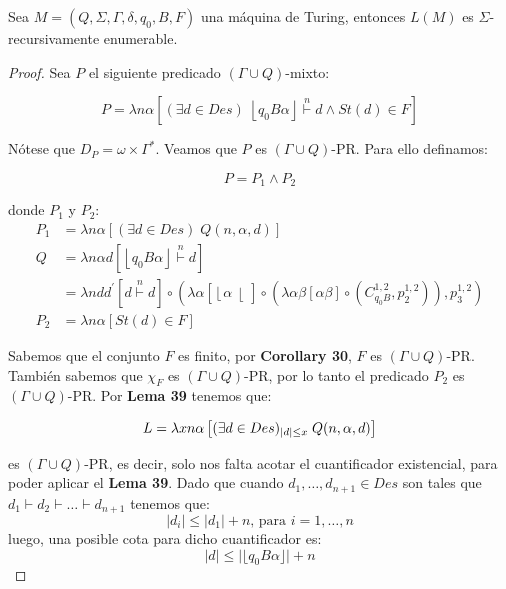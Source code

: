   \begin{theorem}
  	\PN Sea $M = \left(Q, \Sigma, \Gamma, \delta, q_{0}, B, F\right)$ una máquina de Turing, entonces $L(M)$ es
    $\Sigma$-recursivamente enumerable.
  \end{theorem}
  \begin{proof}
    \PN Sea $P$ el siguiente predicado $(\Gamma \cup Q)$-mixto:

    \[
      P = \lambda n\alpha \left[(\exists d \in Des) \; \left\lfloor q_{0} B \alpha \right\rfloor \overset{n}{\vdash} d
      \wedge St(d) \in F\right]
    \]

    \PN Nótese que $D_{P} = \omega \times \Gamma^{\ast}$. Veamos que $P$ es $(\Gamma \cup Q)$-PR. Para ello definamos:

    \[
      P = P_1 \land P_2
    \]

    \PN donde $P_1$ y $P_2$:
    \begin{align*}
      P_1 &= \lambda n\alpha \left[(\exists d \in Des)\; Q(n,\alpha,d)\right] \\
        Q &= \lambda n\alpha d \left[ \left\lfloor q_{0} B \alpha \right\rfloor \overset{n}{\vdash} d\right] \\
          &= \lambda ndd^{\prime} \left[d \overset{n}{\vdash} d\right] \circ (\lambda \alpha \left[\left\lfloor \alpha
             \right\lfloor\right] \circ(\lambda \alpha\beta \left[\alpha\beta\right] \circ (C_{q_0 B}^{1,2}, p_{2}^{1,2}
             )), p_{3}^{1,2}) \\[10pt]
      P_2 &= \lambda n\alpha \left[St(d) \in F\right]
    \end{align*}

    \PN Sabemos que el conjunto $F$ es finito, por \textbf{Corollary 30}, $F$ es $(\Gamma \cup Q)$-PR. También sabemos
    que $\chi_F$ es $(\Gamma \cup Q)$-PR, por lo tanto el predicado $P_2$ es $(\Gamma \cup Q)$-PR.
    \PN Por \textbf{Lema 39} tenemos que:

    \[
      L = \lambda x n\alpha \left[ (\exists d\in Des)_{\lvert d \rvert \leq x}\; Q(n, \alpha, d)\right] \\[10pt]
    \]

    \PN es $(\Gamma \cup Q)$-PR, es decir, solo nos falta acotar el cuantificador existencial, para poder aplicar el
    \textbf{Lema 39}. Dado que cuando $d_{1},\dotsc,d_{n+1} \in Des$ son tales que $d_{1} \vdash d_{2} \vdash \dotsc
    \vdash d_{n+1}$ tenemos que:
    \[
      \left\vert d_{i} \right\vert \leq \left\vert d_{1} \right\vert + n \text{, para } i=1, \dotsc, n
    \]
    \PN luego, una posible cota para dicho cuantificador es:
    \[
      \lvert d \rvert \leq \lvert\lfloor q_{0} B \alpha \rfloor\rvert + n
    \]


\end{proof}
